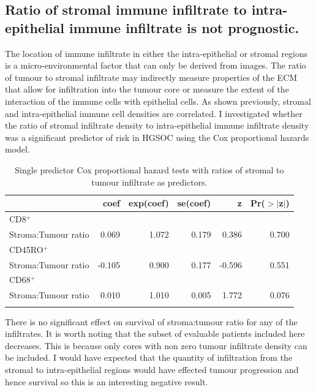 \subsection{Ratio of stromal immune infiltrate to intra-epithelial immune infiltrate is not prognostic.}

The location of immune infiltrate in either the intra-epithelial or stromal regions is a micro-environmental factor that can only be derived from images. The ratio of tumour to stromal infiltrate may indirectly  measure properties of the ECM that allow for infiltration into the tumour core or measure the extent of the interaction of the immune cells with epithelial cells. As shown previously, stromal and intra-epithelial immune cell densities are correlated. I investigated whether the ratio of stromal infiltrate density to intra-epithelial immune infiltrate density was a significant predictor of risk in HGSOC using the Cox proportional hazards model.


\begin{table}[ht]
\centering
\begin{tabular}{rrrrrr}
  \hline
 & coef & exp(coef) & se(coef) & z & Pr($>$$|$z$|$) \\ 
  \hline
\multicolumn{5}{l}{

CD8$^+$
}\\
Stroma:Tumour ratio & 0.069 & 1.072 & 0.179 & 0.386 & 0.700 \\ 
   \hline
\multicolumn{5}{l}{CD45RO$^+$
}\\
Stroma:Tumour ratio & -0.105 & 0.900 & 0.177 & -0.596 & 0.551 \\ 
   \hline
\multicolumn{5}{l}{

CD68$^+$
}\\
Stroma:Tumour ratio & 0.010 & 1.010 & 0.005 & 1.772 & 0.076 \\ 
   \hline
\multicolumn{5}{l}{}\\
\end{tabular}
\caption[Cox regression for ratio of Tumour to Stroma infiltrate]{Single predictor Cox proportional hazard tests with ratios of stromal to tumour infiltrate as predictors.} 
\label{tab:s:t}
\end{table}
There is no significant effect on survival of stroma:tumour ratio for any of the infiltrates. It is worth noting that the subset of evaluable patients included here decreases. This is because only cores with non zero tumour infiltrate density can be included. I would have expected that the quantity of infiltration from the stromal to intra-epithelial regions would have effected tumour progression and hence survival so this is an interesting negative result.

